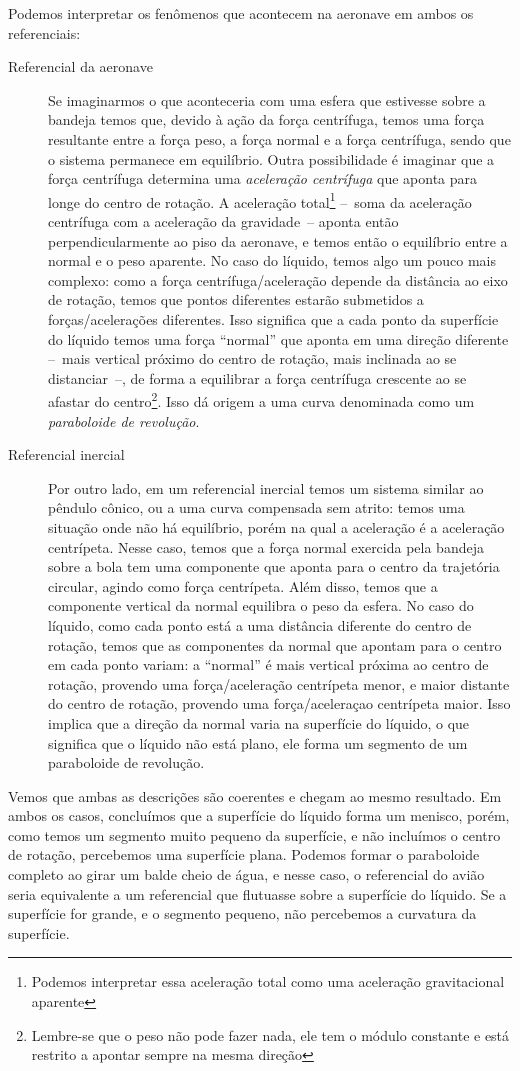 Podemos interpretar os fenômenos que acontecem na aeronave em ambos os referenciais:
\begin{description}
    \item[Referencial da aeronave] Se imaginarmos o que aconteceria com uma esfera que estivesse sobre a bandeja temos que, devido à ação da força centrífuga, temos uma força resultante entre a força peso, a força normal e a força centrífuga, sendo que o sistema permanece em equilíbrio. Outra possibilidade é imaginar que a força centrífuga determina uma \emph{aceleração centrífuga} que aponta para longe do centro de rotação. A aceleração total\footnote{Podemos interpretar essa aceleração total como uma aceleração gravitacional aparente} --~soma da aceleração centrífuga com a aceleração da gravidade~-- aponta então perpendicularmente ao piso da aeronave, e temos então o equilíbrio entre a normal e o peso aparente. No caso do líquido, temos algo um pouco mais complexo: como a força centrífuga/aceleração depende da distância ao eixo de rotação, temos que pontos diferentes estarão submetidos a forças/acelerações diferentes. Isso significa que a cada ponto da superfície do líquido temos uma força ``normal'' que aponta em uma direção diferente --~mais vertical próximo do centro de rotação, mais inclinada ao se distanciar~--, de forma a equilibrar a força centrífuga crescente ao se afastar do centro\footnote{Lembre-se que o peso não pode fazer nada, ele tem o módulo constante e está restrito a apontar sempre na mesma direção}. Isso dá origem a uma curva denominada como um \emph{paraboloide de revolução}.

    \item[Referencial inercial] Por outro lado, em um referencial inercial temos um sistema similar ao pêndulo cônico, ou a uma curva compensada sem atrito: temos uma situação onde não há equilíbrio, porém na qual a aceleração é a aceleração centrípeta. Nesse caso, temos que a força normal exercida pela bandeja sobre a bola tem uma componente que aponta para o centro da trajetória circular, agindo como força centrípeta. Além disso, temos que a componente vertical da normal equilibra o peso da esfera. No caso do líquido, como cada ponto está a uma distância diferente do centro de rotação, temos que as componentes da normal que apontam para o centro em cada ponto variam: a ``normal'' é mais vertical próxima ao centro de rotação, provendo uma força/aceleração centrípeta menor, e maior distante do centro de rotação, provendo uma força/aceleraçao centrípeta maior. Isso implica que a direção da normal varia na superfície do líquido, o que significa que o líquido não está plano, ele forma um segmento de um paraboloide de revolução.
\end{description}
%
Vemos que ambas as descrições são coerentes e chegam ao mesmo resultado. Em ambos os casos, concluímos que a superfície do líquido forma um menisco, porém, como temos um segmento muito pequeno da superfície, e não incluímos o centro de rotação, percebemos uma superfície plana. Podemos formar o paraboloide completo ao girar um balde cheio de água, e nesse caso, o referencial do avião seria equivalente a um referencial que flutuasse sobre a superfície do líquido. Se a superfície for grande, e o segmento pequeno, não percebemos a curvatura da superfície.

